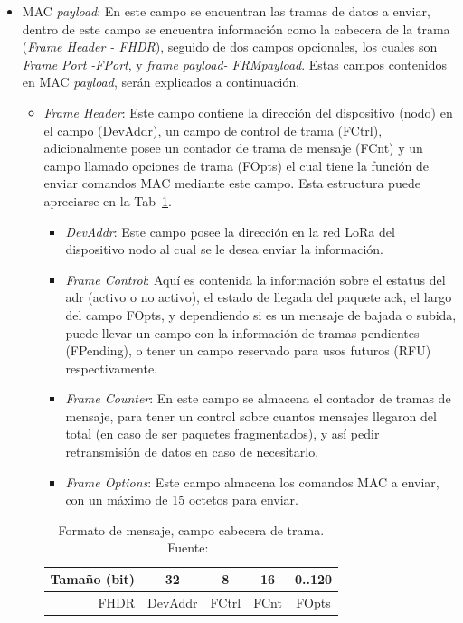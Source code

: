\begin{justify}
\begin{itemize}
\item MAC \textit{payload}: En este campo se encuentran las tramas de datos a enviar, dentro de este campo se encuentra información como la cabecera de la trama (\textit{Frame Header - FHDR}), seguido de dos campos opcionales, los cuales son \textit{Frame Port -FPort}, y \textit{frame payload- FRMpayload}. Estas campos contenidos en MAC \textit{payload}, serán explicados a continuación.
\begin{itemize}
\item \textit{Frame Header}: Este campo contiene la dirección del dispositivo (nodo) en el campo (DevAddr), un campo de control de trama (FCtrl), adicionalmente posee un contador de trama de mensaje (FCnt) y un campo llamado opciones de trama (FOpts) el cual tiene la función de enviar comandos MAC mediante este campo. Esta estructura puede apreciarse en la Tab~\ref{msg:2}.\\
\begin{itemize}
\item \textit{DevAddr}: Este campo posee la dirección en la red LoRa del dispositivo nodo al cual se le desea enviar la información.
\item \textit{Frame Control}: Aquí es contenida la información sobre el estatus del \gls{adr} (activo o no activo), el estado de llegada del paquete \gls{ack}, el largo del campo FOpts, y dependiendo si es un mensaje de bajada o subida, puede llevar un campo con la información de tramas pendientes (FPending), o tener un campo reservado para usos futuros (RFU) respectivamente.
\item \textit{Frame Counter}: En este campo se almacena el contador de tramas de mensaje, para tener un control sobre cuantos mensajes llegaron del total (en caso de ser paquetes fragmentados), y así pedir retransmisión de datos en caso de necesitarlo.
\item \textit{Frame Options}: Este campo almacena los comandos MAC a enviar, con un máximo de 15 octetos para enviar.
\end{itemize}

\begin{table}[!ht]
\centering
\begin{tabular}{|r|c|c|c|c|}
\hline
Tamaño (bit) & 32 & 8 & 16 & 0..120 \\\hline
FHDR & DevAddr & FCtrl & FCnt & FOpts\\\hline
\end{tabular}
\caption{Formato de mensaje, campo cabecera de trama. Fuente:~\cite{Sornin}}
\label{msg:2}
\end{table}


\end{itemize}
\end{itemize}
\end{justify}
